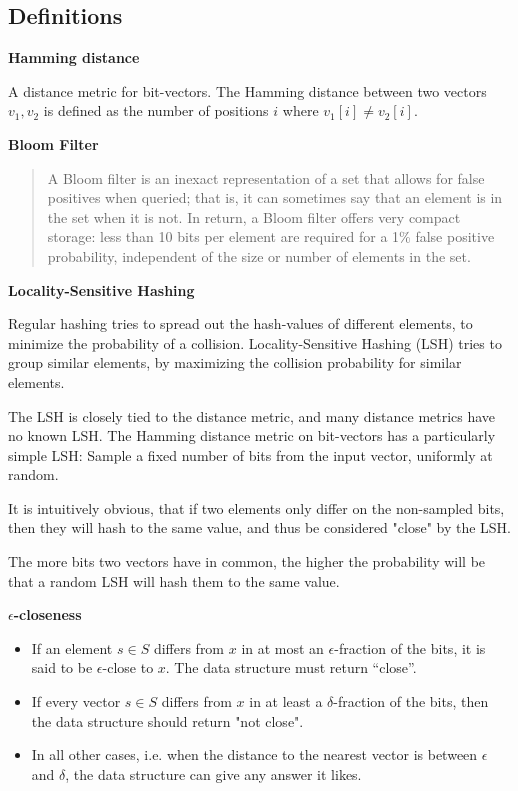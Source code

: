 \documentclass[a4paper,11pt]{article}
\begin{document}
\subsection{Definitions}
\begin{description}
\item \textbf{Hamming distance}

A distance metric for bit-vectors. The Hamming distance between two vectors $v_1, v_2$ is defined as the number of positions $i$ where $v_1[i] \neq v_2[i]$.

\item \textbf{Bloom Filter}

\begin{quotation}
A Bloom filter is an inexact representation of a set that allows for false positives when queried; that is, it can sometimes say that an element is in the set when it is not. In return, a Bloom filter offers very compact storage: less than 10 bits per element are required for a 1\% false positive probability, independent of the size or number of elements in the set.\cite{paper:bloom}
\end{quotation}


\item \textbf{Locality-Sensitive Hashing}

Regular hashing tries to spread out the hash-values of different elements, to minimize the probability of a collision. Locality-Sensitive Hashing (LSH) tries to group similar elements, by maximizing the collision probability for similar elements.

The LSH is closely tied to the distance metric, and many distance metrics have no known LSH. The Hamming distance metric on bit-vectors has a particularly simple LSH: Sample a fixed number of bits from the input vector, uniformly at random. 

It is intuitively obvious, that if two elements only differ on the non-sampled bits, then they will hash to the same value, and thus be considered "close" by the LSH.

The more bits two vectors have in common, the higher the probability will be that a random LSH will hash them to the same value.

\item \textbf{$\epsilon$-closeness}
  \begin{itemize}
    \item If an element $s \in S$ differs from $x$ in at most an $\epsilon$-fraction of the bits, it is said to be $\epsilon$-close to $x$. The data structure must return “close”.
    \item If every vector $s \in S$ differs from $x$ in at least a $\delta$-fraction of the bits, then the data structure should return "not close".
    \item In all other cases, i.e. when the distance to the nearest vector is between $\epsilon$ and $\delta$, the data structure can give any answer it likes.
  \end{itemize}

\end{description}
\end{document}
